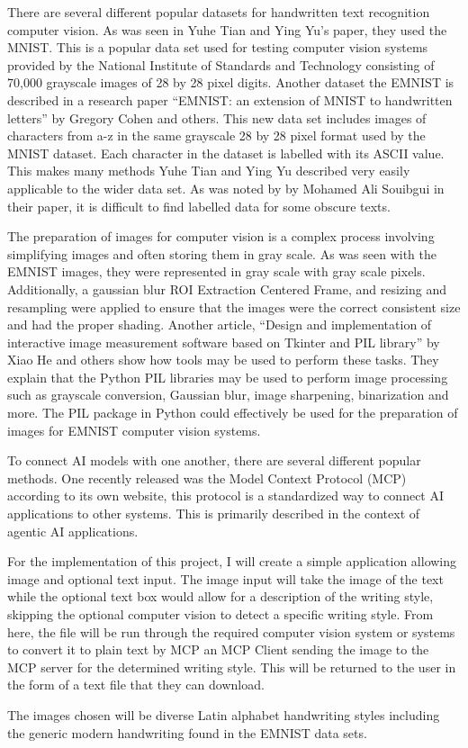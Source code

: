 \documentclass[12pt]{article}
\begin{document}
There are several different popular datasets for handwritten text recognition computer vision. As was seen in Yuhe Tian and Ying Yu’s paper, they used the MNIST. This is a popular data set used for testing computer vision systems provided by the National Institute of Standards and Technology consisting of 70,000 grayscale images of 28 by 28 pixel digits. Another dataset the EMNIST is described in a research paper “EMNIST: an extension of MNIST to handwritten letters” by Gregory Cohen and others. This new data set includes images of characters from a-z in the same grayscale 28 by 28 pixel format used by the MNIST dataset. Each character in the dataset is labelled with its ASCII value.  This makes many methods Yuhe Tian and Ying Yu described very easily applicable to the wider data set. As was noted by by Mohamed Ali Souibgui in their paper, it is difficult to find labelled data for some obscure texts.

The preparation of images for computer vision is a complex process involving simplifying images and often storing them in gray scale. As was seen with the EMNIST images, they were represented in gray scale with gray scale pixels. Additionally, a gaussian blur ROI Extraction Centered Frame, and resizing and resampling were applied to ensure that the images were the correct consistent size and had the proper shading. Another article, “Design and implementation of interactive image measurement software based on Tkinter and PIL library” by Xiao He and others show how tools may be used to perform these tasks. They explain that the Python PIL libraries may be used to perform image processing such as grayscale conversion, Gaussian blur, image sharpening, binarization and more. The PIL package in Python could effectively be used for the preparation of images for EMNIST computer vision systems.

To connect AI models with one another, there are several different popular methods. One recently released was the Model Context Protocol (MCP) according to its own website, this protocol is a standardized way to connect AI applications to other systems. This is primarily described in the context of agentic AI applications.

For the implementation of this project, I will create a simple application allowing image and optional text input. The image input will take the image of the text while the optional text box would allow for a description of the writing style, skipping the optional computer vision to detect a specific writing style. From here, the file will be run through the required computer vision system or systems to convert it to plain text by MCP an MCP Client sending the image to the MCP server for the determined writing style. This will be returned to the user in the form of a text file that they can download. 

The images chosen will be diverse Latin alphabet handwriting styles including the generic modern handwriting found in the EMNIST data sets.  
\end{document}
